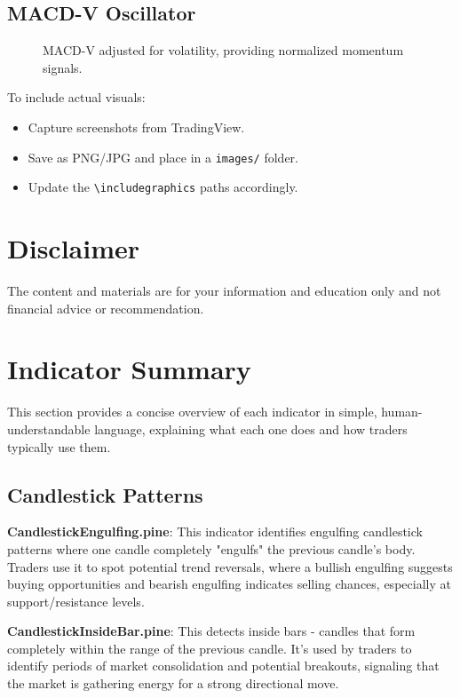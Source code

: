 \documentclass[12pt]{article}
\begin{document}
\subsection{MACD-V Oscillator}
\begin{figure}[H]
\centering
\caption{MACD-V adjusted for volatility, providing normalized momentum signals.}
\label{fig:macdv}
\end{figure}

To include actual visuals:
\begin{itemize}
\item Capture screenshots from TradingView.
\item Save as PNG/JPG and place in a \texttt{images/} folder.
\item Update the \verb|\includegraphics| paths accordingly.
\end{itemize}

\section{Disclaimer}
The content and materials are for your information and education only and not financial advice or recommendation.

\section{Indicator Summary}
\label{sec:summary}

This section provides a concise overview of each indicator in simple, human-understandable language, explaining what each one does and how traders typically use them.

\subsection{Candlestick Patterns}

\textbf{CandlestickEngulfing.pine}: This indicator identifies engulfing candlestick patterns where one candle completely "engulfs" the previous candle's body. Traders use it to spot potential trend reversals, where a bullish engulfing suggests buying opportunities and bearish engulfing indicates selling chances, especially at support/resistance levels.

\textbf{CandlestickInsideBar.pine}: This detects inside bars - candles that form completely within the range of the previous candle. It's used by traders to identify periods of market consolidation and potential breakouts, signaling that the market is gathering energy for a strong directional move.
\end{document}

